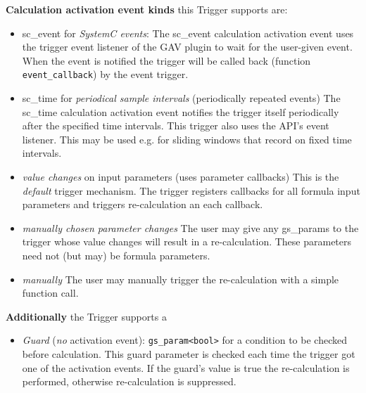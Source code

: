 \textbf{Calculation activation event kinds} this Trigger supports are:
\begin{itemize}
  \item sc\_event for {\em SystemC events}: \vspace{.5em} \newline 
  The sc\_event calculation activation event uses the trigger event listener of the GAV plugin to wait for the user-given event. When the event is notified the trigger will be called back (function \lstinline|event_callback|) by the event trigger.

  \item sc\_time for {\em periodical sample intervals} (periodically repeated events)  \vspace{.5em} \newline 
  The sc\_time calculation activation event notifies the trigger itself periodically after the specified time intervals. This trigger also uses the API's event listener. This may be used e.g. for sliding windows that record on fixed time intervals.
  
  \item {\em value changes} on input parameters (uses parameter callbacks)  \vspace{.5em} \newline 
  This is the {\em default} trigger mechanism. The trigger registers callbacks for all formula input parameters and triggers re-calculation an each callback.
  
  \item {\em manually chosen parameter changes}
   The user may give any gs\_params to the trigger whose value changes will result in a re-calculation. These parameters need not (but may) be formula parameters.
  
  \item {\em manually}  \vspace{.5em} \newline
  The user may manually trigger the re-calculation with a simple function call.
\end{itemize}

\textbf{Additionally} the Trigger supports a
\begin{itemize}
  \item {\em Guard} ({\em no} activation event): \lstinline[language=TeX]|gs_param<bool>| for a condition to be checked before calculation.  \vspace{.5em} \newline 
  This guard parameter is checked each time the trigger got one of the activation events. If the guard's value is {\sffamily true} the re-calculation is performed, otherwise re-calculation is suppressed.
\end{itemize}

